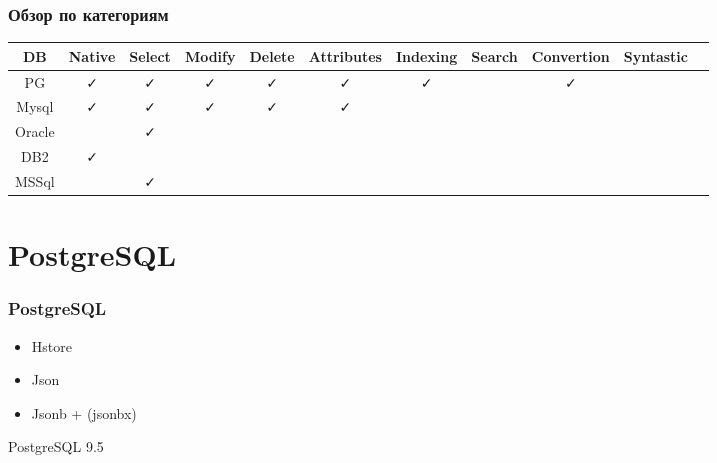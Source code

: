 \documentclass[14pt, compress, aspectratio=169]{beamer}
\def\check{\textcolor{check}{\FA \faCheck}}
\def\fail{\textcolor{fail}{\FA \faRemove}}
\def\question{\textcolor{question}{\FA \faSearch}}
\begin{document}
\begin{frame}[fragile]
    \frametitle{Обзор по категориям}

    \begin{adjustbox}{max totalsize={1.1\textwidth}{2.0\textheight},center}
        \begin{tabular}{c | c | c | c | c | c | c | c | c | c | c}
            DB & Native & Select & Modify & Delete & Attributes & Indexing & Search & Convertion & Syntastic \\
            \hline
            PG & \check & \check & \check & \check & \check & \check & \question & \check & \question \\
            Mysql & \check & \check & \check & \check & \check & \question & \question & \fail & \question \\
            Oracle & \fail & \check & \fail & \fail & \fail & \fail & \question & \question & \question \\
            DB2 & \check & \fail & \fail & \fail & \fail & \fail & \fail & \question & \fail \\
            MSSql & \fail & \check & \fail & \fail & \fail & \fail & \question & \question & \fail \\
        \end{tabular}
    \end{adjustbox}
\end{frame}

\section{PostgreSQL}

\begin{frame}[fragile]
    \frametitle{PostgreSQL}
    \begin{itemize}[label={\MVRightarrow}]
        \item Hstore
        \item Json
        \item \alert{Jsonb + (jsonbx)}
    \end{itemize}

    PostgreSQL 9.5
\end{frame}
    
\end{document}
